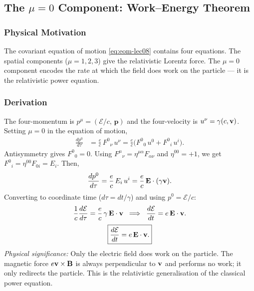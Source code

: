 \subsection{The $\mu=0$ Component: Work--Energy Theorem}\label{subsec:energy}

\subsubsection*{Physical Motivation}
The covariant equation of motion \eqref{eq:eom-lec08} contains four equations.  The spatial components ($\mu = 1,2,3$) give the relativistic Lorentz force.  The $\mu = 0$ component encodes the rate at which the field does work on the particle — it is the relativistic power equation.

\subsubsection*{Derivation}

The four-momentum is $p^\mu = (\mathcal{E}/c,\,\mathbf{p})$ and the four-velocity is $u^\nu = \gamma(c,\mathbf{v})$.  Setting $\mu = 0$ in the equation of motion,
\begin{align}
  \frac{dp^0}{d\tau}
  &= \frac{e}{c}\,F^{0}{}_\nu\,u^\nu
   = \frac{e}{c}\bigl(F^{0}{}_{0}\,u^0 + F^{0}{}_{i}\,u^i\bigr).
\end{align}
Antisymmetry gives $F^0{}_0 = 0$.  Using $F^{\mu}{}_\nu = \eta^{\mu\alpha}F_{\alpha\nu}$ and $\eta^{00}=+1$, we get $F^0{}_i = \eta^{00}F_{0i} = E_i$.  Then,
\begin{equation}
  \frac{dp^0}{d\tau} = \frac{e}{c}\,E_i\,u^i = \frac{e}{c}\,\mathbf{E}\cdot(\gamma\mathbf{v}).
\end{equation}
Converting to coordinate time ($d\tau = dt/\gamma$) and using $p^0 = \mathcal{E}/c$:
\begin{equation}
  \frac{1}{c}\frac{d\mathcal{E}}{d\tau} = \frac{e}{c}\,\gamma\,\mathbf{E}\cdot\mathbf{v}
  \;\;\Longrightarrow\;\;
  \frac{d\mathcal{E}}{dt} = e\,\mathbf{E}\cdot\mathbf{v}.
\end{equation}
\begin{equation}\label{eq:power}
  \boxed{\frac{d\mathcal{E}}{dt} = e\,\mathbf{E}\cdot\mathbf{v}.}
\end{equation}
\textit{Physical significance:} Only the electric field does work on the particle.  The magnetic force $e\mathbf{v}\times\mathbf{B}$ is always perpendicular to $\mathbf{v}$ and performs no work; it only redirects the particle.  This is the relativistic generalisation of the classical power equation.

